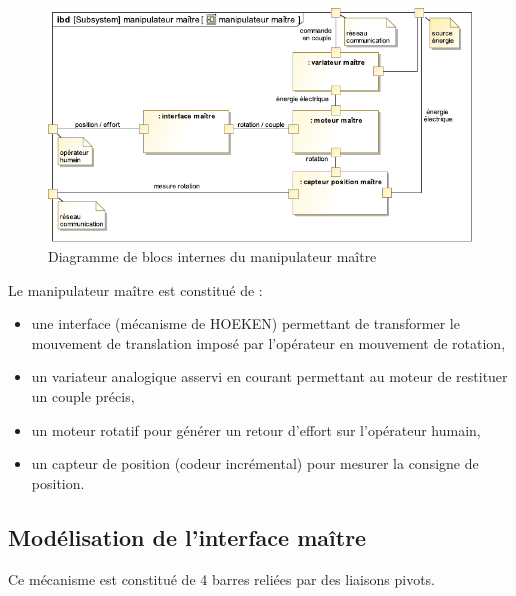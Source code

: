 \begin{figure}[ht!]
\begin{center}
 \includegraphics[width=0.9\linewidth]{img/Figure3}
\end{center}
\caption{Diagramme de blocs internes du manipulateur maître}
\label{fig3}
\end{figure}

Le manipulateur maître est constitué de :
\begin{itemize}
 \item une interface (mécanisme de HOEKEN) permettant de transformer le mouvement de
translation imposé par l'opérateur en mouvement de rotation,
 \item un variateur analogique asservi en courant permettant au moteur de restituer  un
couple précis,
 \item un moteur rotatif pour générer un retour d'effort sur l'opérateur humain,
 \item un capteur de position (codeur incrémental) pour mesurer la consigne de  position.
\end{itemize}

\subsection{Modélisation de l'interface maître}

Ce mécanisme est constitué de 4 barres reliées par des liaisons pivots.

